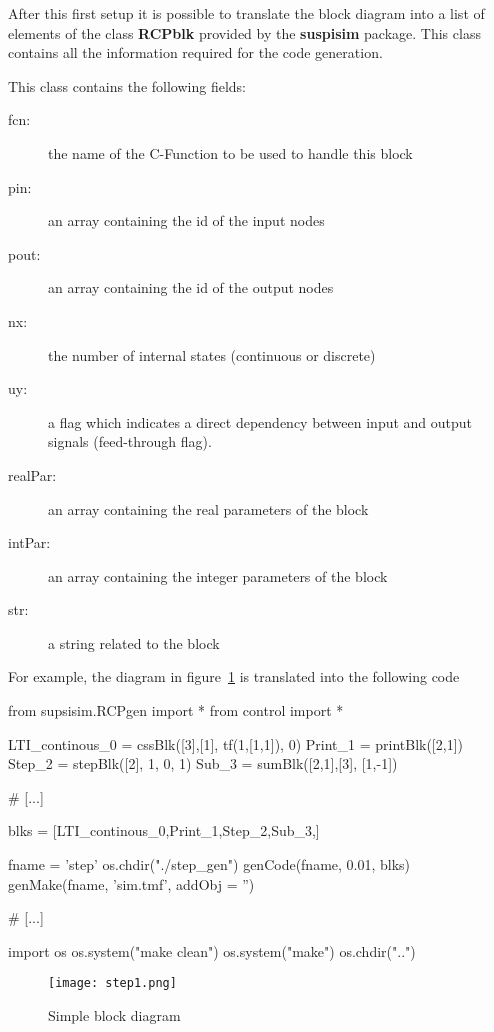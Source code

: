 After this first setup it is possible to translate the block diagram into a 
list of elements of the class \textbf{RCPblk} provided by the 
\textbf{suspisim} package. This class contains all the information required 
for the code generation.

This class contains the following fields:

\begin{description}
\item[fcn:] the name of the C-Function to be used to handle this block
\item [pin:] an array containing the id of the input nodes
\item [pout:] an array containing the id of the output nodes
\item [nx:] the number of internal states (continuous or discrete)
\item [uy:] a flag which indicates a direct dependency between input and 
output signals (feed-through flag).
\item [realPar:] an array containing the real parameters of the block
\item [intPar:] an array containing the integer parameters of the block
\item [str:] a string related to the block
\end{description}

For example, the diagram in figure~\ref{F18} is translated into the following 
code

\begin{code}
from supsisim.RCPgen import *
from control import *

LTI_continous_0 = cssBlk([3],[1], tf(1,[1,1]),  0)
Print_1 = printBlk([2,1])
Step_2 = stepBlk([2],  1,  0,  1)
Sub_3 = sumBlk([2,1],[3],  [1,-1])

# [...]

blks = [LTI_continous_0,Print_1,Step_2,Sub_3,]

fname = 'step'
os.chdir("./step_gen")
genCode(fname, 0.01, blks)
genMake(fname, 'sim.tmf', addObj = '')

# [...]

import os
os.system("make clean")
os.system("make")
os.chdir("..")
\end{code}

\begin{figure}[htbp]	%
\centering
\texttt{[image: step1.png]}
\caption{Simple block diagram}
\label{F18}
\end{figure}

